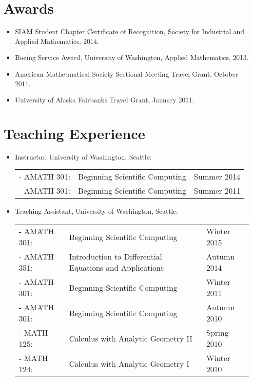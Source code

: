 \documentclass{article}
\begin{document}
\section*{Awards}

\begin{itemize}
  \item SIAM Student Chapter Certificate of Recognition, Society for
    Industrial and Applied Mathematics, 2014.
  \item Boeing Service Award, University of Washington, Applied
    Mathematics, 2013.
  \item American Mathetmatical Society Sectional Meeting Travel Grant,
    October 2011.
  \item University of Alaska Fairbanks Travel Grant, January 2011.
\end{itemize}


\section*{Teaching Experience}



\begin{itemize}
  \item Instructor, University of Washington, Seattle:

    \begin{tabular}{ p{2.25cm} p{10.5cm} p{2.25cm} }
      - AMATH 301: & Beginning Scientific Computing      & Summer 2014 \\
      - AMATH 301: & Beginning Scientific Computing      & Summer 2011 \\
    \end{tabular}

  \item Teaching Assistant, University of Washington, Seattle:

    \begin{tabular}{ p{2.25cm} p{10.5cm} p{2.25cm} }
      - AMATH 301: & Beginning Scientific Computing      & Winter 2015 \\
      - AMATH 351: & Introduction to Differential Equations and Applications
                   & Autumn 2014 \\
      - AMATH 301: & Beginning Scientific Computing      & Winter 2011 \\
      - AMATH 301: & Beginning Scientific Computing      & Autumn 2010 \\
      - MATH 125:  & Calculus with Analytic Geometry II  & Spring 2010 \\
      - MATH 124:  & Calculus with Analytic Geometry I   & Winter 2010 \\
    \end{tabular}

\end{itemize}
\end{document}
